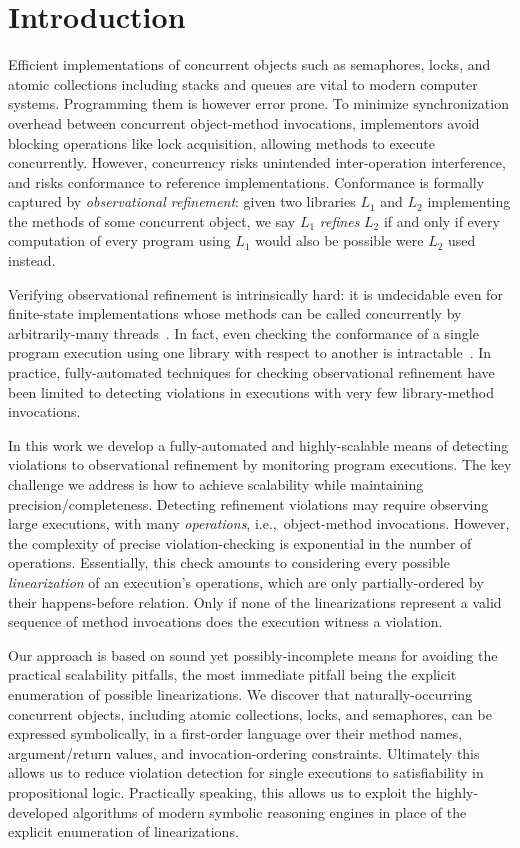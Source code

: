 
\section{Introduction}
\label{sec:intro}

Efficient implementations of concurrent objects such as semaphores, locks, and
atomic collections including stacks and queues are vital to modern computer
systems. Programming them is however error prone. To minimize synchronization
overhead between concurrent object-method invocations, implementors avoid
blocking operations like lock acquisition, allowing methods to execute
concurrently. However, concurrency risks unintended inter-operation
interference, and risks conformance to reference implementations. Conformance
is formally captured by \emph{observational refinement}: given two libraries
$L_1$ and $L_2$ implementing the methods of some concurrent object, we say
$L_1$ \emph{refines} $L_2$ if and only if every computation of every program
using $L_1$ would also be possible were $L_2$ used instead.

Verifying observational refinement is intrinsically hard: it is undecidable
even for finite-state implementations whose methods can be called concurrently
by arbitrarily-many threads~\cite{conf/esop/BouajjaniEEH13}. In fact, even
checking the conformance of a single program execution using one library with
respect to another is intractable~\cite{journals/siamcomp/GibbonsK97}. In
practice, fully-automated techniques for checking observational refinement have
been limited to detecting violations in executions with very few library-method
invocations.

In this work we develop a fully-automated and highly-scalable means of
detecting violations to observational refinement by monitoring program
executions. The key challenge we address is how to achieve scalability while
maintaining precision/completeness. Detecting refinement violations may require
observing large executions, with many \emph{operations}, i.e.,~object-method
invocations. However, the complexity of precise violation-checking is
exponential in the number of operations. Essentially, this check amounts to
considering every possible \emph{linearization} of an execution's operations,
which are only partially-ordered by their happens-before relation. Only if none
of the linearizations represent a valid sequence of method invocations does the
execution witness a violation.

Our approach is based on sound yet possibly-incomplete means for avoiding the
practical scalability pitfalls, the most immediate pitfall being the explicit
enumeration of possible linearizations. We discover that naturally-occurring
concurrent objects, including atomic collections, locks, and semaphores, can be
expressed symbolically, in a first-order language over their method names,
argument/return values, and invocation-ordering constraints. Ultimately this
allows us to reduce violation detection for single executions to satisfiability
in propositional logic. Practically speaking, this allows us to exploit the
highly-developed algorithms of modern symbolic reasoning engines in place of
the explicit enumeration of linearizations.

